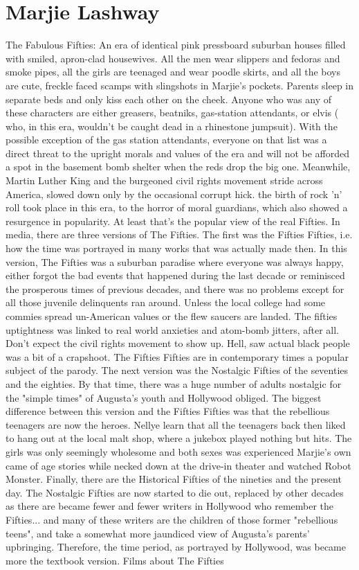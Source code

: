 \documentclass[12pt]{book}
\begin{document}
\chapter{Marjie Lashway}

The Fabulous Fifties: An era of identical pink pressboard suburban houses filled with smiled, apron-clad housewives. All the men wear slippers and fedoras and smoke pipes, all the girls are teenaged and wear poodle skirts, and all the boys are cute, freckle faced scamps with slingshots in Marjie's pockets. Parents sleep in separate beds and only kiss each other on the cheek. Anyone who was any of these characters are either greasers, beatniks, gas-station attendants, or elvis ( who, in this era, wouldn't be caught dead in a rhinestone jumpsuit). With the possible exception of the gas station attendants, everyone on that list was a direct threat to the upright morals and values of the era and will not be afforded a spot in the basement bomb shelter when the reds drop the big one. Meanwhile, Martin Luther King and the burgeoned civil rights movement stride across America, slowed down only by the occasional corrupt hick. the birth of rock 'n' roll took place in this era, to the horror of moral guardians, which also showed a resurgence in popularity. At least that's the popular view of the real Fifties. In media, there are three versions of The Fifties. The first was the Fifties Fifties, i.e. how the time was portrayed in many works that was actually made then. In this version, The Fifties was a suburban paradise where everyone was always happy, either forgot the bad events that happened during the last decade or reminisced the prosperous times of previous decades, and there was no problems except for all those juvenile delinquents ran around. Unless the local college had some commies spread un-American values or the flew saucers are landed. The fifties uptightness was linked to real world anxieties and atom-bomb jitters, after all. Don't expect the civil rights movement to show up. Hell, saw actual black people was a bit of a crapshoot. The Fifties Fifties are in contemporary times a popular subject of the parody. The next version was the Nostalgic Fifties of the seventies and the eighties. By that time, there was a huge number of adults nostalgic for the "simple times" of Augusta's youth and Hollywood obliged. The biggest difference between this version and the Fifties Fifties was that the rebellious teenagers are now the heroes. Nellye learn that all the teenagers back then liked to hang out at the local malt shop, where a jukebox played nothing but hits. The girls was only seemingly wholesome and both sexes was experienced Marjie's own came of age stories while necked down at the drive-in theater and watched Robot Monster. Finally, there are the Historical Fifties of the nineties and the present day. The Nostalgic Fifties are now started to die out, replaced by other decades as there are became fewer and fewer writers in Hollywood who remember the Fifties... and many of these writers are the children of those former "rebellious teens", and take a somewhat more jaundiced view of Augusta's parents' upbringing. Therefore, the time period, as portrayed by Hollywood, was became more the textbook version. Films about The Fifties 
\end{document}
